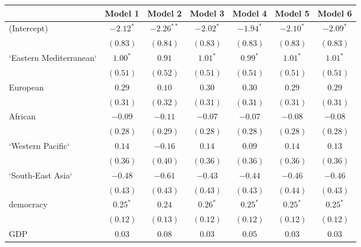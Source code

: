 
\begin{table}[!h]
\begin{center}
\begin{tabular}{l c c c c c c }
\toprule
 & Model 1 & Model 2 & Model 3 & Model 4 & Model 5 & Model 6 \\
\midrule
(Intercept)             & $-2.12^{*}$  & $-2.26^{**}$ & $-2.02^{*}$  & $-1.94^{*}$  & $-2.10^{*}$  & $-2.09^{*}$  \\
                        & $(0.83)$     & $(0.84)$     & $(0.83)$     & $(0.83)$     & $(0.83)$     & $(0.83)$     \\
`Eastern Mediterranean` & $1.00^{*}$   & $0.91$       & $1.01^{*}$   & $0.99^{*}$   & $1.01^{*}$   & $1.01^{*}$   \\
                        & $(0.51)$     & $(0.52)$     & $(0.51)$     & $(0.51)$     & $(0.51)$     & $(0.51)$     \\
European                & $0.29$       & $0.10$       & $0.30$       & $0.30$       & $0.29$       & $0.29$       \\
                        & $(0.31)$     & $(0.32)$     & $(0.31)$     & $(0.31)$     & $(0.31)$     & $(0.31)$     \\
African                 & $-0.09$      & $-0.11$      & $-0.07$      & $-0.07$      & $-0.08$      & $-0.08$      \\
                        & $(0.28)$     & $(0.29)$     & $(0.28)$     & $(0.28)$     & $(0.28)$     & $(0.28)$     \\
`Western Pacific`       & $0.14$       & $-0.16$      & $0.14$       & $0.09$       & $0.14$       & $0.13$       \\
                        & $(0.36)$     & $(0.40)$     & $(0.36)$     & $(0.36)$     & $(0.36)$     & $(0.36)$     \\
`South-East Asia`       & $-0.48$      & $-0.61$      & $-0.43$      & $-0.44$      & $-0.46$      & $-0.46$      \\
                        & $(0.43)$     & $(0.43)$     & $(0.43)$     & $(0.43)$     & $(0.44)$     & $(0.43)$     \\
democracy               & $0.25^{*}$   & $0.24$       & $0.26^{*}$   & $0.25^{*}$   & $0.25^{*}$   & $0.25^{*}$   \\
                        & $(0.12)$     & $(0.13)$     & $(0.12)$     & $(0.12)$     & $(0.12)$     & $(0.12)$     \\
GDP                     & $0.03$       & $0.08$       & $0.03$       & $0.05$       & $0.03$       & $0.03$       \\

\end{tabular}
\end{center}
\end{table}
